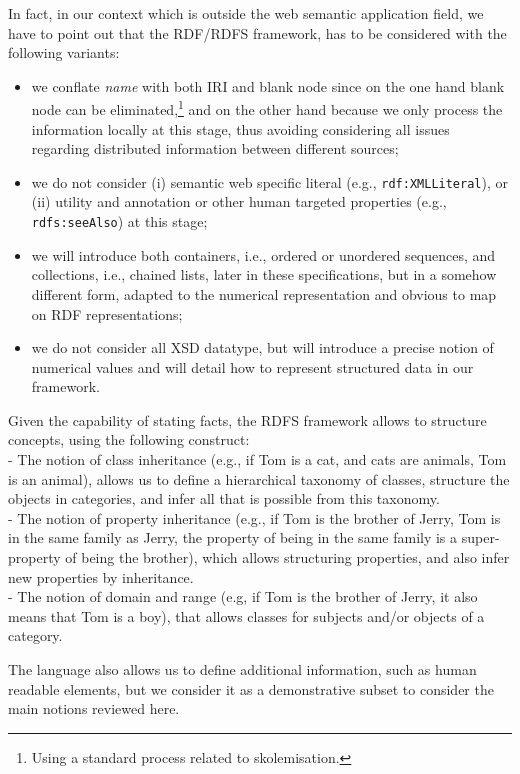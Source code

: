 \documentclass[sn-mathphys]{sn-jnl}
\begin{document}
\begin{appendices}
In fact, in our context which is outside the web semantic application field, we have to point out that the RDF/RDFS framework, has to be considered with the following variants:
\begin{itemize}
    \item we conflate \emph{name} with both IRI and blank node since on the one hand blank node can be eliminated,\footnote{Using a standard process related to skolemisation.} and on the other hand because we only process the information locally at this stage, thus avoiding considering all issues regarding distributed information between different sources;
    \item we do not consider (i) semantic web specific literal (e.g., \texttt{rdf:XMLLiteral}), or (ii) utility and annotation or other human targeted  properties (e.g., \texttt{rdfs:seeAlso}) at this stage;
    \item we will introduce both containers, i.e., ordered or unordered sequences, and collections, i.e., chained lists, later in these specifications, but in a somehow different form, adapted to the numerical representation and obvious to map on RDF representations;
    \item we do not consider all XSD datatype, but will introduce a precise notion of numerical values and will detail how to represent structured data in our framework.
\end{itemize}

Given the capability of stating facts, the RDFS framework allows to structure concepts, using the following construct:
\\ - The notion of class inheritance (e.g., if Tom is a cat, and cats are animals, Tom is an animal), allows us to define a hierarchical taxonomy of classes, structure the objects in categories, and infer all that is possible from this taxonomy.
\\ - The notion of property inheritance (e.g., if Tom is the brother of Jerry, Tom is in the same family as Jerry, the property of being in the same family is a super-property of being the brother), which allows structuring properties, and also infer new properties by inheritance.
\\ - The notion of domain and range (e.g, if Tom is the brother of Jerry, it also means that Tom is a boy), that allows classes for subjects and/or objects of a category.

The language also allows us to define additional information, such as human readable elements, but we consider it as a demonstrative subset to consider the main notions reviewed here.


\end{appendices}
\end{document}

